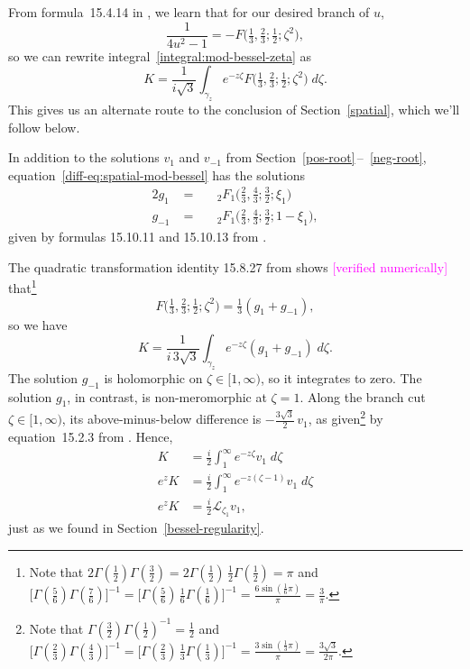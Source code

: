 \documentclass{article}
\theoremstyle{definition}
\newcommand{\laplace}{\mathcal{L}}
\begin{document}
From formula~15.4.14 in \cite{dlmf}, we learn that for our desired branch of $u$,
\[ \frac{1}{4u^2 - 1} = -F\big(\tfrac{1}{3}, \tfrac{2}{3}; \tfrac{1}{2}; \zeta^2\big), \]
so we can rewrite integral~\eqref{integral:mod-bessel-zeta} as
\[ K = \frac{1}{i\sqrt{3}} \int_{\gamma_z} e^{-z\zeta} F\big(\tfrac{1}{3}, \tfrac{2}{3}; \tfrac{1}{2}; \zeta^2\big)\;d\zeta. \]
This gives us an alternate route to the conclusion of Section~\ref{spatial}, which we'll follow below.

In addition to the solutions $v_1$ and $v_{-1}$ from Section~\ref{pos-root}\,--\, \ref{neg-root}, equation~\eqref{diff-eq:spatial-mod-bessel} has the solutions
\begin{alignat*}{2}
g_1 &\;=\;& & {}_2F_1\big(\tfrac{2}{3}, \tfrac{4}{3}; \tfrac{3}{2}; \xi_1\big) \\
g_{-1} &\;=\;&  & {}_2F_1\big(\tfrac{2}{3}, \tfrac{4}{3}; \tfrac{3}{2}; 1-\xi_1\big),
\end{alignat*}
given by formulas 15.10.11 and 15.10.13 from \cite{dlmf}.

The quadratic transformation identity 15.8.27 from \cite{dlmf} shows \textcolor{magenta}{[verified numerically]} that\footnote{Note that $2\Gamma(\tfrac{1}{2})\Gamma(\tfrac{3}{2}) = 2\Gamma(\tfrac{1}{2})\,\tfrac{1}{2}\Gamma(\tfrac{1}{2}) = \pi$ and $\big[\Gamma(\tfrac{5}{6})\Gamma(\tfrac{7}{6})\big]^{-1} = \big[\Gamma(\tfrac{5}{6})\,\tfrac{1}{6}\Gamma(\tfrac{1}{6})\big]^{-1} = \frac{6\sin(\tfrac{1}{6} \pi)}{\pi} = \frac{3}{\pi}$.}
\[ F\big(\tfrac{1}{3}, \tfrac{2}{3}; \tfrac{1}{2}; \zeta^2\big) = \tfrac{1}{3}(g_1 + g_{-1}), \]
so we have
\[ K = \frac{1}{i\,3\sqrt{3}} \int_{\gamma_z} e^{-z\zeta} (g_1 + g_{-1})\;d\zeta. \]
The solution $g_{-1}$ is holomorphic on $\zeta \in [1, \infty)$, so it integrates to zero. The solution $g_1$, in contrast, is non-meromorphic at $\zeta = 1$. Along the branch cut $\zeta \in [1, \infty)$, its above-minus-below difference is $-\tfrac{3\sqrt{3}}{2}\,v_1$,
as given\footnote{Note that $\Gamma(\tfrac{3}{2}) \Gamma(\tfrac{1}{2})^{-1} = \tfrac{1}{2}$ and $\big[\Gamma(\tfrac{2}{3})\Gamma(\tfrac{4}{3})\big]^{-1} = \big[\Gamma(\tfrac{2}{3})\,\tfrac{1}{3}\Gamma(\tfrac{1}{3})\big]^{-1} = \frac{3\sin(\tfrac{1}{3} \pi)}{\pi} = \frac{3\sqrt{3}}{2\pi}$.} by equation~15.2.3 from \cite{dlmf}.
Hence,
\begin{align*}
K & = \frac{i}{2} \int^\infty_1 e^{-z\zeta} v_1\;d\zeta \\
e^z K & = \frac{i}{2} \int^\infty_1 e^{-z(\zeta - 1)} v_1\;d\zeta \\
e^z K & = \tfrac{i}{2} \laplace_{\zeta_1} v_1,
\end{align*}
just as we found in Section~\ref{bessel-regularity}.
\end{document}
